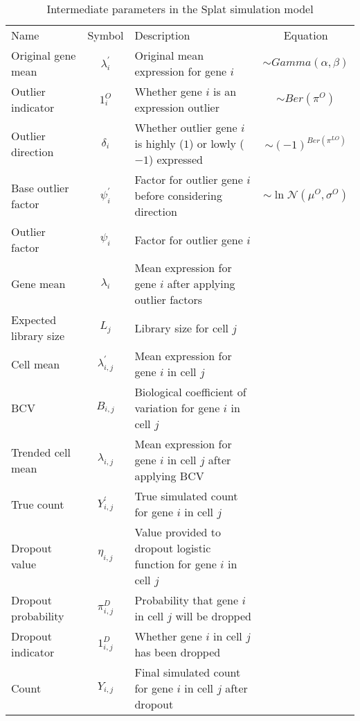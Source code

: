 \begin{table} 
    \begin{tabular}{ l c l c }
        Name & Symbol & Description & Equation \\
        Original gene mean & $\lambda^{'}_i$ & Original mean expression for gene $i$ & $\sim Gamma(\alpha, \beta)$\\
        Outlier indicator & $1^{O}_i$ & Whether gene $i$ is an expression outlier & $\sim Ber(\pi^{O})$\\ 
        Outlier direction & $\delta_i$ & Whether outlier gene $i$ is highly ($1$) or lowly ($-1$) expressed & $\sim (-1)^{Ber(\pi^{LO})}$\\
        Base outlier factor & $\psi^{'}_i$ & Factor for outlier gene $i$ before considering direction & $\sim \ln \mathcal{N}(\mu^{O}, \sigma^{O})$\\
        Outlier factor & $\psi_i$ & Factor for outlier gene $i$ & \\
        Gene mean & $\lambda_i$ & Mean expression for gene $i$ after applying outlier factors & \\
        Expected library size & $L_j$ & Library size for cell $j$ & \\
        Cell mean & $\lambda^{'}_{i,j}$ & Mean expression for gene $i$ in cell $j$ & \\
        BCV & $B_{i,j}$ & Biological coefficient of variation for gene $i$ in cell $j$ & \\
        Trended cell mean & $\lambda_{i,j}$ & Mean expression for gene $i$ in cell $j$ after applying BCV & \\
        True count & $Y^{'}_{i,j}$ & True simulated count for gene $i$ in cell $j$ & \\
        Dropout value & $\eta_{i,j}$ & Value provided to dropout logistic function for gene $i$ in cell $j$ & \\
        Dropout probability & $\pi^{D}_{i,j}$ & Probability that gene $i$ in cell $j$ will be dropped & \\
        Dropout indicator & $1^{D}_{i,j}$ & Whether gene $i$ in cell $j$ has been dropped & \\
        Count & $Y_{i,j}$ & Final simulated count for gene $i$ in cell $j$ after dropout & \\
    \end{tabular} 
    \caption{Intermediate parameters in the Splat simulation model} 
\end{table}